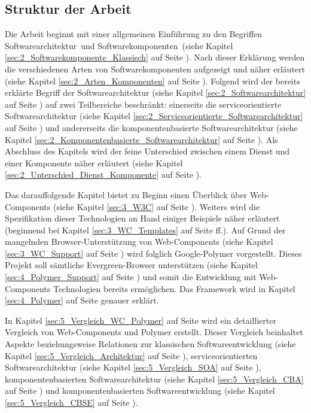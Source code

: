 
\subsection{Struktur der Arbeit}
\label{sec:1_Struktur}


Die Arbeit beginnt mit einer allgemeinen Einführung zu den Begriffen \glqq Softwarearchitektur\grqq\ und \glqq Softwarekomponenten\grqq\ (siehe Kapitel \ref{sec:2_Softwarekomponente_Klassisch} auf Seite \pageref{sec:2_Softwarekomponente_Klassisch}). Nach dieser Erklärung werden die verschiedenen Arten von Softwarekomponenten aufgezeigt und näher erläutert (siehe Kapitel \ref{sec:2_Arten_Komponenten} auf Seite \pageref{sec:2_Arten_Komponenten}). Folgend wird der bereits erklärte Begriff der Softwarearchitektur (siehe Kapitel \ref{sec:2_Softwarearchitektur} auf Seite \pageref{sec:2_Softwarearchitektur}) auf zwei Teilbereiche beschränkt: einerseits die serviceorientierte Softwarearchitektur (siehe Kapitel \ref{sec:2_Serviceorientierte_Softwarearchitektur} auf Seite \pageref{sec:2_Serviceorientierte_Softwarearchitektur}) und andererseits die komponentenbasierte Softwarearchitektur (siehe Kapitel \ref{sec:2_Komponentenbasierte_Softwarearchitektur} auf Seite \pageref{sec:2_Komponentenbasierte_Softwarearchitektur}). Als Abschluss des Kapitels wird der feine Unterschied zwischen einem Dienst und einer Komponente näher erläutert (siehe Kapitel \ref{sec:2_Unterschied_Dienst_Komponente} auf Seite \pageref{sec:2_Unterschied_Dienst_Komponente}).

Das darauffolgende Kapitel bietet zu Beginn einen Überblick über Web-Components (siehe Kapitel \ref{sec:3_W3C} auf Seite \pageref{sec:3_W3C}). Weiters wird die Spezifikation dieser Technologien an Hand einiger Beispiele näher erläutert (beginnend bei Kapitel \ref{sec:3_WC_Templates} auf Seite \pageref{sec:3_WC_Templates} ff.). Auf Grund der mangelnden Browser-Unterstützung von Web-Components (siehe Kapitel \ref{sec:3_WC_Support} auf Seite \pageref{sec:3_WC_Support}) wird folglich Google-Polymer vorgestellt. Dieses Projekt soll sämtliche \glqq Evergreen\grqq -Browser unterstützen (siehe Kapitel \ref{sec:4_Polymer_Support} auf Seite \pageref{sec:4_Polymer_Support}) und somit die Entwicklung mit Web-Components Technologien bereits ermöglichen. Das Framework wird in Kapitel \ref{sec:4_Polymer} auf Seite \pageref{sec:4_Polymer} genauer erklärt.

In Kapitel \ref{sec:5_Vergleich_WC_Polymer} auf Seite \pageref{sec:5_Vergleich_WC_Polymer} wird ein detaillierter Vergleich von Web-Components und Polymer erstellt. Dieser Vergleich beinhaltet Aspekte beziehungsweise Relationen zur klassischen Softwareentwicklung (siehe Kapitel \ref{sec:5_Vergleich_Architektur} auf Seite \pageref{sec:5_Vergleich_Architektur}), serviceorientierten Softwarearchitektur (siehe Kapitel \ref{sec:5_Vergleich_SOA} auf Seite \pageref{sec:5_Vergleich_SOA}), komponentenbasierten Softwarearchitektur (siehe Kapitel \ref{sec:5_Vergleich_CBA} auf Seite \pageref{sec:5_Vergleich_CBA}) und komponentenbasierten Softwareentwicklung (siehe Kapitel \ref{sec:5_Vergleich_CBSE} auf Seite \pageref{sec:5_Vergleich_CBSE}).

